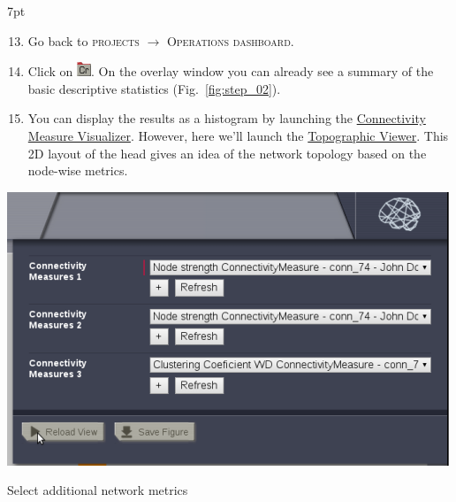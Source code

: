 \documentclass{tufte-handout}
\newenvironment{formal}{%
  \def\FrameCommand{%
    \hspace{1pt}%
    {\color{DarkBlue}\vrule width 2pt}%
    {\color{formalshade}\vrule width 4pt}%
    \colorbox{formalshade}%
  }%
  \MakeFramed{\advance\hsize-\width\FrameRestore}%
  \noindent\hspace{-4.55pt}%
  \begin{adjustwidth}{}{7pt}%
  \vspace{2pt}\vspace{2pt}%
}
{%
  \vspace{2pt}\end{adjustwidth}\endMakeFramed%
}
\begin{document}
\begin{formal}
  \begin{enumerate}[resume]
  \setcounter{enumi}{12}
  \item Go back to \textsc{projects} $\rightarrow$ \textsc{Operations dashboard}.
  \item Click on \includegraphics[width=0.042\linewidth]{nodeConnectivityMeasure}. On
  the overlay window you can already see a summary of the basic descriptive
  statistics (Fig.~\ref{fig:step_02}).
  \item You can display the results as a histogram by launching the \underline{Connectivity Measure Visualizer}. However, here we'll launch the \underline{Topographic Viewer}. This 2D layout of the
head gives an idea of the network topology based on the node-wise
metrics. 
  \end{enumerate}
\end{formal}


\newpage
\begin{marginfigure}
  \includegraphics[width=\linewidth]{Handout_UI_ModellingStructuralLesions_AnalysisView}%
  \caption{Select additional network metrics}%
  \label{fig:step_05}%
\end{marginfigure}
\end{document}
